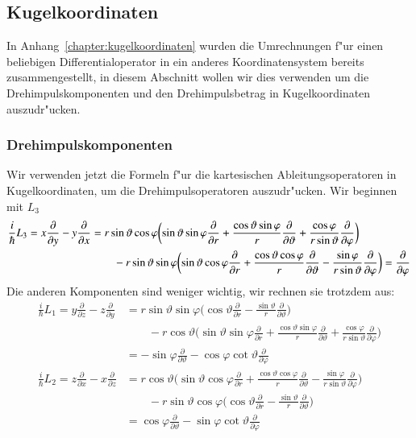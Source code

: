 \subsection{Kugelkoordinaten}
In Anhang~\ref{chapter:kugelkoordinaten} wurden die Umrechnungen f"ur
einen beliebigen Differentialoperator in ein anderes Koordinatensystem
bereits zusammengestellt, in diesem Abschnitt wollen wir dies verwenden
um die Drehimpulskomponenten und den Drehimpulsbetrag in Kugelkoordinaten
auszudr"ucken.
\subsubsection{Drehimpulskomponenten}
Wir verwenden jetzt die Formeln f"ur die kartesischen Ableitungsoperatoren
in Kugelkoordinaten, um die Drehimpulsoperatoren auszudr"ucken.
Wir beginnen mit $L_3$
\begin{align}
\frac{i}{\hbar}
L_3
=
x\frac{\partial}{\partial y}
-
y\frac{\partial}{\partial x}
&=
r\sin\vartheta\cos\varphi
\biggl(
\sin\vartheta\sin\varphi
\frac{\partial}{\partial r}
+
\frac{\cos\vartheta\sin\varphi}{r}
\frac{\partial}{\partial\vartheta}
+
\frac{\cos\varphi}{r\sin\vartheta}
\frac{\partial}{\partial\varphi}
\biggr)
\notag
\\
&\qquad
-
r\sin\vartheta\sin\varphi
\biggl(
\sin\vartheta\cos\varphi
\frac{\partial}{\partial r}
+
\frac{\cos\vartheta\cos\varphi}{r}
\frac{\partial}{\partial\vartheta}
-
\frac{\sin\varphi}{r\sin\vartheta}
\frac{\partial}{\partial\varphi}
\biggr)
=
\frac{\partial}{\partial\varphi}
\label{skript:l3spherical}
\end{align}
Die anderen Komponenten sind weniger wichtig, wir rechnen sie trotzdem
aus:
\begin{align*}
\frac{i}{\hbar}L_1
=
y\frac{\partial}{\partial z}-z\frac{\partial}{\partial y}
&=
r\sin\vartheta\sin\varphi
\biggl(
\cos\vartheta
\frac{\partial}{\partial r}
-
\frac{\sin\vartheta}{r}
\frac{\partial}{\partial\vartheta}
\biggr)
\\
&\qquad
-
r\cos\vartheta
\biggl(
\sin\vartheta\sin\varphi
\frac{\partial}{\partial r}
+
\frac{\cos\vartheta\sin\varphi}{r}
\frac{\partial}{\partial\vartheta}
+
\frac{\cos\varphi}{r\sin\vartheta}
\frac{\partial}{\partial\varphi}
\biggr)
\\
&=
-\sin\varphi\frac{\partial}{\partial\vartheta}
-\cos\varphi\cot\vartheta\frac{\partial}{\partial\varphi}
\\
\frac{i}{\hbar}L_2
=
z\frac{\partial}{\partial x}-x\frac{\partial}{\partial z}
&=
r\cos\vartheta
\biggl(
\sin\vartheta\cos\varphi
\frac{\partial}{\partial r}
+
\frac{\cos\vartheta\cos\varphi}{r}
\frac{\partial}{\partial\vartheta}
-
\frac{\sin\varphi}{r\sin\vartheta}
\frac{\partial}{\partial\varphi}
\biggr)
\\
&\qquad
-
r\sin\vartheta\cos\varphi
\biggl(
\cos\vartheta
\frac{\partial}{\partial r}
-
\frac{\sin\vartheta}{r}
\frac{\partial}{\partial\vartheta}
\biggr)
\\
&=
\cos\varphi\frac{\partial}{\partial\vartheta}
-\sin\varphi\cot\vartheta\frac{\partial}{\partial\varphi}
\end{align*}
